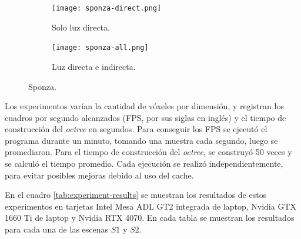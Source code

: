 \begin{figure}[H]
	\begin{subfigure}{0.49\textwidth}
	  \centering
	  \texttt{[image: sponza-direct.png]}
	  \caption{Solo luz directa.}
	\end{subfigure}
	\begin{subfigure}{0.49\textwidth}
	  \centering
	  \texttt{[image: sponza-all.png]}
	  \caption{Luz directa e indirecta.}
	\end{subfigure}
	\caption{Sponza.}
	\label{fig:sponza}
\end{figure}

Los experimentos varían la cantidad de vóxeles por dimensión, y registran los cuadros por segundo alcanzados (FPS, por sus siglas en inglés) y el tiempo de construcción del \textit{octree} en segundos.
Para conseguir los FPS se ejecutó el programa durante un minuto, tomando una muestra cada segundo, luego se promediaron.
Para el tiempo de construcción del \textit{octree}, se construyó 50 veces y se calculó el tiempo promedio.
Cada ejecución se realizó independientemente, para evitar posibles mejoras debido al uso del cache.

En el cuadro \ref{tab:experiment-results} se muestran los resultados de estos experimentos en tarjetas Intel Mesa ADL GT2 integrada de laptop, Nvidia GTX 1660 Ti de laptop y Nvidia RTX 4070.
En cada tabla se muestran los resultados para cada una de las escenas $S1$ y $S2$.

